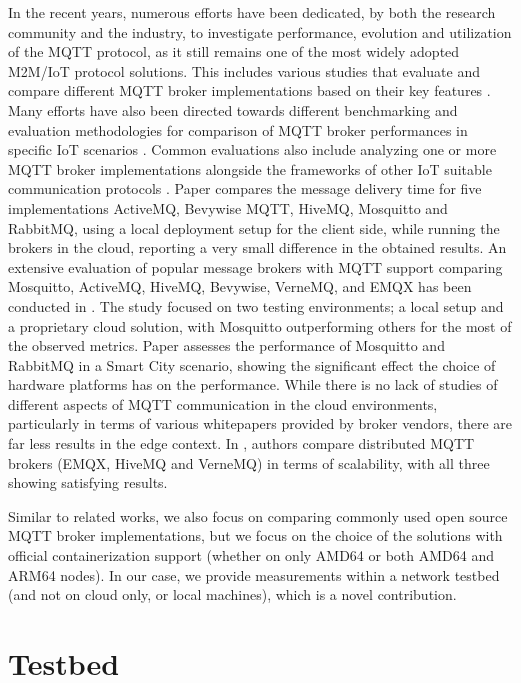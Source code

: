 \documentclass[conference]{IEEEtran}
\begin{document}
In the recent years, numerous efforts have been dedicated, by both the research community and the industry, 
to investigate performance, evolution and utilization of the MQTT protocol, as it still remains one of 
the most widely adopted M2M/IoT protocol solutions. This includes various studies that evaluate and compare different MQTT broker implementations based on their key features 
\cite{mishra2020use}. Many efforts have also been directed towards different benchmarking and evaluation methodologies for comparison of
MQTT broker performances in specific IoT scenarios \cite{gheorghe2020performance}. Common evaluations also include 
analyzing one or more MQTT broker implementations alongside the frameworks of other IoT suitable communication 
protocols \cite{herrnleben2021combench, 9090208}.
Paper \cite{mishra2018performance} compares the message delivery time for five implementations ActiveMQ, Bevywise MQTT, HiveMQ, Mosquitto and RabbitMQ, using a local deployment setup for the client side, while running the brokers in the cloud, reporting a very small difference in the obtained results.
An extensive evaluation of popular message brokers with MQTT support 
comparing Mosquitto, ActiveMQ, HiveMQ, Bevywise, VerneMQ, and EMQX  has been conducted in \cite{mishra2021stress}. The study focused on two testing environments; a local setup and a proprietary cloud solution, with Mosquitto outperforming others for the most of the observed metrics. Paper \cite{8783166} assesses the performance of Mosquitto and RabbitMQ in a Smart City scenario, showing the significant effect the choice of hardware platforms has on the performance. While there is no lack of studies of different aspects of MQTT communication in the cloud environments, particularly in terms of various  whitepapers provided by broker vendors, there are far less results in the edge context. In \cite{koziolek2020comparison}, authors compare distributed MQTT brokers (EMQX, HiveMQ and VerneMQ) in terms of scalability, with all three showing satisfying results. 

Similar to related works, we also focus on comparing commonly used open source MQTT broker implementations, but we focus on the choice of the solutions with official containerization support (whether on only AMD64 or both AMD64 and ARM64 nodes). In our case, we provide measurements within a network testbed (and not on cloud only, or local machines), which is a novel contribution. 



\section{Testbed}
\end{document}
